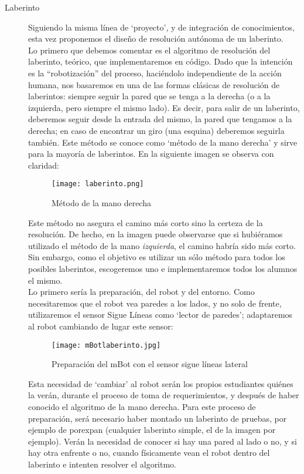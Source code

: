 \begin{description}
	\item[Laberinto] \label{ej:laberinto}
	Siguiendo la misma línea de `proyecto', y de integración de conocimientos, esta vez proponemos el diseño de resolución autónoma de un laberinto. \\
	Lo primero que debemos comentar es el algoritmo de resolución del laberinto, teórico, que implementaremos en código. Dado que la intención es la ``robotización'' del proceso, haciéndolo independiente de la acción humana, nos basaremos en una de las formas clásicas de resolución de laberintos: siempre seguir la pared que se tenga a la derecha (o a la izquierda, pero siempre el mismo lado). Es decir, para salir de un laberinto, deberemos seguir desde la entrada del mismo, la pared que tengamos a la derecha; en caso de encontrar un giro (una esquina) deberemos seguirla también. Este método se conoce como `método de la mano derecha' y sirve para la mayoría de laberintos. En la siguiente imagen se observa con claridad:
	\begin{figure}[H]
		\texttt{[image: laberinto.png]}
		\centering
		\label{img:laberinto}
		\caption{Método de la mano derecha}
	\end{figure}
	Este método no asegura el camino más corto sino la certeza de la resolución. De hecho, en la imagen puede observarse que si hubiéramos utilizado el método de la mano \textit{izquierda}, el camino habría sido más corto. Sin embargo, como el objetivo es utilizar un sólo método para todos los posibles laberintos, escogeremos uno e implementaremos todos los alumnos el mismo. \\
	Lo primero sería la preparación, del robot y del entorno. Como necesitaremos que el robot vea paredes a los lados, y no solo de frente, utilizaremos el sensor Sigue Líneas como `lector de paredes'; adaptaremos al robot cambiando de lugar este sensor:
	\begin{figure}[H]
		\texttt{[image: mBotlaberinto.jpg]}
		\centering
		\label{img:mBotlaberinto}
		\caption{Preparación del mBot con el sensor sigue líneas lateral}
	\end{figure}
	Esta necesidad de `cambiar' al robot serán los propios estudiantes quiénes la verán, durante el proceso de toma de requerimientos, y después de haber conocido el algoritmo de la mano derecha. Para este proceso de preparación, será necesario haber montado un laberinto de pruebas, por ejemplo de porexpan (cualquier laberinto simple, el de la imagen por ejemplo). Verán la necesidad de conocer si hay una pared al lado o no, y si hay otra enfrente o no, cuando físicamente vean el robot dentro del laberinto e intenten resolver el algoritmo. \\

\end{description}
